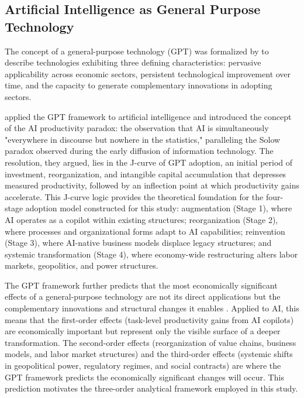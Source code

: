 \documentclass[preprint,review,12pt]{elsarticle}
\begin{document}
\subsection{Artificial Intelligence as General Purpose Technology}
\label{sec:ai_as_gpt}

The concept of a general-purpose technology (GPT) was formalized by \citet{bresnahan1995gpt} to describe technologies exhibiting three defining characteristics: pervasive applicability across economic sectors, persistent technological improvement over time, and the capacity to generate complementary innovations in adopting sectors.

\citet{brynjolfsson2017productivity} applied the GPT framework to artificial intelligence and introduced the concept of the AI productivity paradox: the observation that AI is simultaneously "everywhere in discourse but nowhere in the statistics," paralleling the Solow paradox observed during the early diffusion of information technology. The resolution, they argued, lies in the J-curve of GPT adoption, an initial period of investment, reorganization, and intangible capital accumulation that depresses measured productivity, followed by an inflection point at which productivity gains accelerate. This J-curve logic provides the theoretical foundation for the four-stage adoption model constructed for this study: augmentation (Stage 1), where AI operates as a copilot within existing structures; reorganization (Stage 2), where processes and organizational forms adapt to AI capabilities; reinvention (Stage 3), where AI-native business models displace legacy structures; and systemic transformation (Stage 4), where economy-wide restructuring alters labor markets, geopolitics, and power structures.

The GPT framework further predicts that the most economically significant effects of a general-purpose technology are not its direct applications but the complementary innovations and structural changes it enables \citep{bresnahan1995gpt, korzinov2018gpt, coccia2018longwaves}. Applied to AI, this means that the first-order effects (task-level productivity gains from AI copilots) are economically important but represent only the visible surface of a deeper transformation. The second-order effects (reorganization of value chains, business models, and labor market structures) and the third-order effects (systemic shifts in geopolitical power, regulatory regimes, and social contracts) are where the GPT framework predicts the economically significant changes will occur. This prediction motivates the three-order analytical framework employed in this study.
\end{document}
